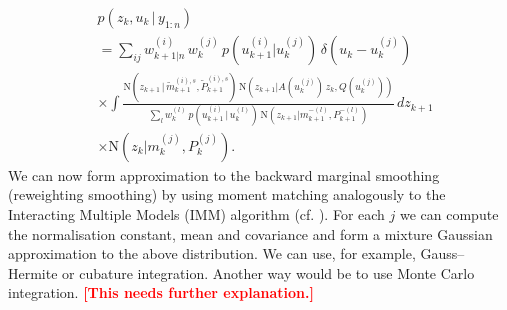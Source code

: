 \documentclass[twocolumn]{autart}    %
\newcommand{\comment}[1]{\textcolor{red}{\textbf{[#1]}}}
\begin{document}
\begin{equation}
\begin{split}
 &p(z_{k},u_{k} \,|\, y_{1:n}) \\
 &= \sum_{ij} w^{(i)}_{k+1|n} \, w_k^{(j)} \,
      p(u_{k+1}^{(i)} | u_k^{(j)}) \, \delta(u_{k} - u_{k}^{(j)}) \\
 &\times \int
    \frac{\mathrm{N}(z_{k+1}\,|\,\tilde{m}_{k+1}^{(i),s},\tilde{P}_{k+1}^{(i),s}) \,
          \mathrm{N}(z_{k+1} | A(u_k^{(j)}) \, z_k, Q(u_k^{(j)}))}
        {\sum_l w_k^{(l)} \, p(u_{k+1}^{(i)}\,|\,u_k^{(l)}) \,
          \mathrm{N}(z_{k+1} | m^{-(l)}_{k+1}, P^{-(l)}_{k+1})} \, dz_{k+1} \\
  &\times \mathrm{N}(z_{k} | m^{(j)}_{k}, P^{(j)}_{k}).
\end{split}
\end{equation}
%
We can now form approximation to the backward marginal smoothing (reweighting smoothing) by using moment matching analogously to the Interacting Multiple Models (IMM) algorithm \cite{Bar-Shalom+Li+Kirubarajan:2001} (cf. \cite{Barber:2006}). For each $j$ we can compute the normalisation constant, mean and covariance and form a mixture Gaussian approximation to the above distribution. We can use, for example, Gauss--Hermite or cubature integration. Another way would be to use Monte Carlo integration. \comment{This needs further explanation.}
\end{document}

